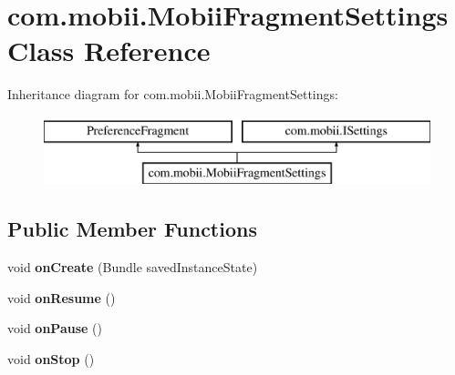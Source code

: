 \hypertarget{classcom_1_1mobii_1_1_mobii_fragment_settings}{\section{com.\-mobii.\-Mobii\-Fragment\-Settings Class Reference}
\label{classcom_1_1mobii_1_1_mobii_fragment_settings}
}
Inheritance diagram for com.\-mobii.\-Mobii\-Fragment\-Settings\-:\begin{figure}[H]
\begin{center}
\leavevmode
\includegraphics[height=2.000000cm]{classcom_1_1mobii_1_1_mobii_fragment_settings}
\end{center}
\end{figure}
\subsection*{Public Member Functions}
\begin{DoxyCompactItemize}
\item 
\hypertarget{classcom_1_1mobii_1_1_mobii_fragment_settings_a1af62fd2ab85a1e16d32700327878d70}{void {\bfseries on\-Create} (Bundle saved\-Instance\-State)}\label{classcom_1_1mobii_1_1_mobii_fragment_settings_a1af62fd2ab85a1e16d32700327878d70}

\item 
\hypertarget{classcom_1_1mobii_1_1_mobii_fragment_settings_a88ca3bf93ccad93a013559931696cd40}{void {\bfseries on\-Resume} ()}\label{classcom_1_1mobii_1_1_mobii_fragment_settings_a88ca3bf93ccad93a013559931696cd40}

\item 
\hypertarget{classcom_1_1mobii_1_1_mobii_fragment_settings_a9435bc60eb03077bb989f57cb87bbf9b}{void {\bfseries on\-Pause} ()}\label{classcom_1_1mobii_1_1_mobii_fragment_settings_a9435bc60eb03077bb989f57cb87bbf9b}

\item 
\hypertarget{classcom_1_1mobii_1_1_mobii_fragment_settings_ae89ffa1357251aa76eae5cf459c7e7c8}{void {\bfseries on\-Stop} ()}\label{classcom_1_1mobii_1_1_mobii_fragment_settings_ae89ffa1357251aa76eae5cf459c7e7c8}

\end{DoxyCompactItemize}
